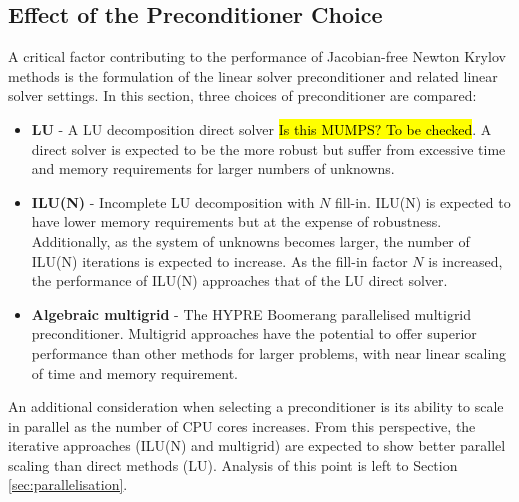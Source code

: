 \documentclass[sn-mathphys,Numbered,draft]{sn-jnl}%
\begin{document}
\subsection{Effect of the Preconditioner Choice}
A critical factor contributing to the performance of Jacobian-free Newton Krylov methods is the formulation of the linear solver preconditioner and related linear solver settings.
In this section, three choices of preconditioner are compared:
\begin{itemize}
	\item \textbf{LU} - A LU decomposition direct solver \hl{Is this MUMPS? To be checked}. A direct solver is expected to be the more robust but suffer from excessive time and memory requirements for larger numbers of unknowns.
	\item \textbf{ILU(N)} - Incomplete LU decomposition with $N$ fill-in. ILU(N) is expected to have lower memory requirements but at the expense of robustness. Additionally, as the system of unknowns becomes larger, the number of ILU(N) iterations is expected to increase. As the fill-in factor $N$ is increased, the performance of ILU(N) approaches that of the LU direct solver.
	\item \textbf{Algebraic multigrid} - The HYPRE Boomerang parallelised multigrid preconditioner. Multigrid approaches have the potential to offer superior performance than other methods for larger problems, with near linear scaling of time and memory requirement.
\end{itemize}

An additional consideration when selecting a preconditioner is its ability to scale in parallel as the number of CPU cores increases.
From this perspective, the iterative approaches (ILU(N) and multigrid) are expected to show better parallel scaling than direct methods (LU).
Analysis of this point is left to Section \ref{sec:parallelisation}.
\end{document}
